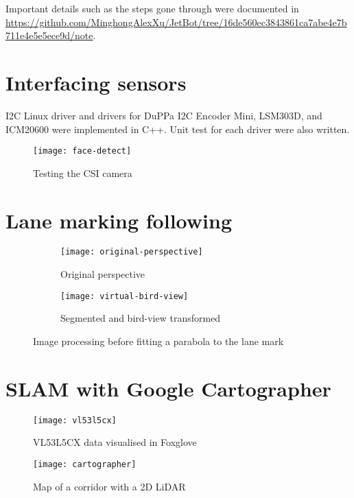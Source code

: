 \newpage
\appendix
\appendixpage
\addappheadtotoc

Important details such as the steps gone through were documented in \url{https://github.com/MinghongAlexXu/JetBot/tree/16de560ec3843861ca7abe4e7b711e4e5e5ece9d/note}.



\section{Interfacing sensors}

I2C Linux driver and drivers for DuPPa I2C Encoder Mini, LSM303D, and ICM20600 were implemented in C++. Unit test for each driver were also written.

\begin{figure}[htbp]
   \centering
   \texttt{[image: face-detect]}
   \caption{Testing the CSI camera}
   \label{fig:face-detect}
\end{figure}



\section{Lane marking following}

\begin{figure}[htbp]
\centering
\begin{subfigure}[b]{0.49\textwidth}
   \centering
   \texttt{[image: original-perspective]}
   \caption{Original perspective}
\end{subfigure}
\begin{subfigure}[b]{0.49\textwidth}
   \centering
   \texttt{[image: virtual-bird-view]}
   \caption{Segmented and bird-view transformed}
\end{subfigure}
\caption{Image processing before fitting a parabola to the lane mark}
\label{fig:line}
\end{figure}


\newpage
\section{SLAM with Google Cartographer}

\begin{figure}[htbp]
   \centering
   \texttt{[image: vl53l5cx]}
   \caption{VL53L5CX data visualised in Foxglove}
   \label{fig:vl53l5cx}
\end{figure}

\begin{figure}[htbp]
   \centering
   \texttt{[image: cartographer]}
   \caption{Map of a corridor with a 2D LiDAR}
   \label{fig:cartographer}
\end{figure}
